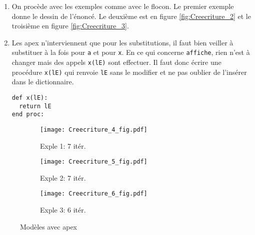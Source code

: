 \begin{enumerate}
\item On procède avec les exemples comme avec le flocon. Le premier exemple donne le dessin de l'énoncé. Le deuxième est en figure \ref{fig:Creecriture_2} et le troisième en figure \ref{fig:Creecriture_3}.
\item Les apex n'interviennent que pour les substitutions, il faut bien veiller à substituer à la fois  pour \verb|a| et pour \verb|x|. En ce qui concerne \verb|affiche|, rien n'est à changer mais des appels \verb|x(lE)| sont effectuer. Il faut donc écrire une procédure \verb|x(lE)| qui renvoie \verb|lE| sans le modifier et ne pas oublier de l'insérer dans le dictionnaire.
\begin{verbatim}
def x(lE):
  return lE
end proc:
\end{verbatim}
\end{enumerate}
\begin{figure}
  \centering
  \begin{subfigure}[b]{4cm}
    \texttt{[image: Creecriture\_4\_fig.pdf]}
    \caption{Exple 1: 7 itér.}
    \label{fig:Creecriture_4}
  \end{subfigure}
  \begin{subfigure}[b]{4cm}
    \texttt{[image: Creecriture\_5\_fig.pdf]}
    \caption{Exple 2: 7 itér.}
    \label{fig:Creecriture_5}
  \end{subfigure}
  \begin{subfigure}[b]{4cm}
    \texttt{[image: Creecriture\_6\_fig.pdf]}
    \caption{Exple 3: 6 itér.}
    \label{fig:Creecriture_6}
  \end{subfigure}
  \caption{Modèles avec apex}
\end{figure}

